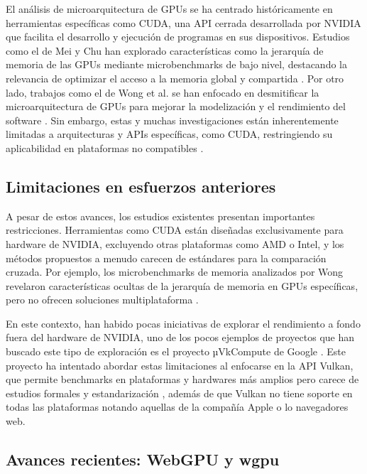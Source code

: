 \documentclass[conference]{IEEEtran}
\begin{document}
El análisis de microarquitectura de GPUs se ha centrado históricamente en
herramientas específicas como CUDA, una API cerrada desarrollada por NVIDIA que
facilita el desarrollo y ejecución de programas en sus dispositivos. Estudios
como el de Mei y Chu han explorado características como la jerarquía de memoria
de las GPUs mediante microbenchmarks de bajo nivel, destacando la relevancia de
optimizar el acceso a la memoria global y compartida \cite{mei2016dissectinggpumemoryhierarchy}. Por otro lado, trabajos
como el de Wong et al. se han enfocado en desmitificar la microarquitectura de
GPUs para mejorar la modelización y el rendimiento del software \cite{wong2010demystifying}. Sin embargo,
estas y muchas investigaciones están inherentemente limitadas a arquitecturas y
APIs específicas, como CUDA, restringiendo su aplicabilidad en plataformas no
compatibles \cite{jia2018dissecting} \cite{jia2019dissecting} \cite{luo2024benchmarking} \cite{anzt2020evaluating} \cite{abdelkhalik2022demystifying}.

\subsection{Limitaciones en esfuerzos anteriores}

A pesar de estos avances, los estudios existentes presentan importantes
restricciones. Herramientas como CUDA están diseñadas exclusivamente para
hardware de NVIDIA, excluyendo otras plataformas como AMD o Intel, y los métodos
propuestos a menudo carecen de estándares para la comparación cruzada. Por
ejemplo, los microbenchmarks de memoria analizados por Wong revelaron
características ocultas de la jerarquía de memoria en GPUs específicas, pero no
ofrecen soluciones multiplataforma \cite{wong2010demystifying}.

En este contexto, han habido pocas iniciativas de explorar el rendimiento a
fondo fuera del hardware de NVIDIA, uno de los pocos ejemplos de proyectos que
han buscado este tipo de exploración es el proyecto µVkCompute de Google
\cite{uVkCompute}. Este proyecto ha intentado abordar estas limitaciones al
enfocarse en la API Vulkan, que permite benchmarks en plataformas y hardwares
más amplios pero carece de estudios formales y estandarización
\cite{devon2024gpuperformancemodelingmicrobenchmarks}, además de que Vulkan no
tiene soporte en todas las plataformas notando aquellas de la compañía Apple o
lo navegadores web.

\subsection{Avances recientes: WebGPU y wgpu}
\end{document}
